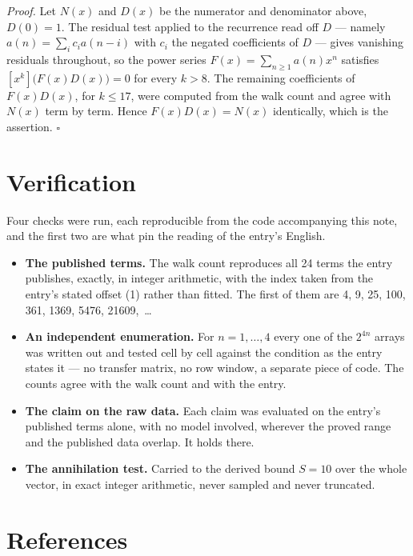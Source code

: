 \documentclass[11pt]{article}
\theoremstyle{definition}
\begin{document}
{\itshape Proof.} Let $N(x)$ and $D(x)$ be the numerator and denominator above, $D(0)=1$. The residual test applied to the recurrence read off $D$ --- namely $a(n) = \sum_i c_i a(n-i)$ with $c_i$ the negated coefficients of $D$ --- gives vanishing residuals throughout, so the power series $F(x)=\sum_{n\ge 1}a(n)x^n$ satisfies $[x^k]\bigl(F(x)D(x)\bigr) = 0$ for every $k > 8$. The remaining coefficients of $F(x)D(x)$, for $k \le 17$, were computed from the walk count and agree with $N(x)$ term by term. Hence $F(x)D(x) = N(x)$ identically, which is the assertion. $\square$

\section{Verification}

Four checks were run, each reproducible from the code accompanying this note, and the first two are what pin the reading of the entry's English.

\begin{itemize}

\item {\bfseries The published terms.} The walk count reproduces all 24 terms the entry publishes, exactly, in integer arithmetic, with the index taken from the entry's stated offset (1) rather than fitted. The first of them are 4, 9, 25, 100, 361, 1369, 5476, 21609,~\dots

\item {\bfseries An independent enumeration.} For $n = 1,\dots,4$ every one of the $2^{4n}$ arrays was written out and tested cell by cell against the condition as the entry states it --- no transfer matrix, no row window, a separate piece of code. The counts agree with the walk count and with the entry.

\item {\bfseries The claim on the raw data.} Each claim was evaluated on the entry's published terms alone, with no model involved, wherever the proved range and the published data overlap. It holds there.

\item {\bfseries The annihilation test.} Carried to the derived bound $S = 10$ over the whole vector, in exact integer arithmetic, never sampled and never truncated.

\end{itemize}

\section{References}
\end{document}
